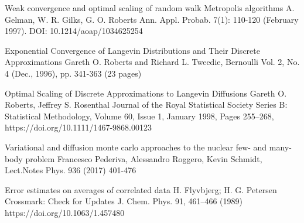 \documentclass{article}
\begin{document}
\begin{thebibliography}{9}
Weak convergence and optimal scaling of random walk Metropolis algorithms
A. Gelman, W. R. Gilks, G. O. Roberts
Ann. Appl. Probab. 7(1): 110-120 (February 1997). DOI: 10.1214/aoap/1034625254

Exponential Convergence of Langevin Distributions and Their Discrete Approximations
Gareth O. Roberts and Richard L. Tweedie, Bernoulli
Vol. 2, No. 4 (Dec., 1996), pp. 341-363 (23 pages)

Optimal Scaling of Discrete Approximations to Langevin Diffusions 
Gareth O. Roberts, Jeffrey S. Rosenthal
Journal of the Royal Statistical Society Series B: Statistical Methodology, Volume 60, Issue 1, January 1998, Pages 255–268, https://doi.org/10.1111/1467-9868.00123

Variational and diffusion monte carlo approaches to the nuclear few- and many-body problem
Francesco Pederiva, Alessandro Roggero, Kevin Schmidt, Lect.Notes Phys. 936 (2017) 401-476

Error estimates on averages of correlated data 
H. Flyvbjerg; H. G. Petersen
Crossmark: Check for Updates
J. Chem. Phys. 91, 461–466 (1989)
https://doi.org/10.1063/1.457480


\end{thebibliography}
\end{document}
